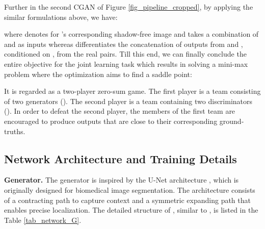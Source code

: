 \documentclass[10pt,twocolumn,letterpaper]{article}
\begin{document}
Further in the second CGAN of Figure \ref{fig_pipeline_cropped}, by applying the similar formulations above, we have:







\begin{table}[t]
	\begin{center}
	\end{center}
	\vspace{-5pt}
	\caption{The architectures for discriminator  of ST-CGAN. Annotations are kept the same with Table \ref{tab_network_G}.}
	\label{tab_network_D}
	\vspace{-8pt}
\end{table}



\vspace{-15pt}



where  denotes for 's corresponding shadow-free image and  takes a combination of  and  as inputs whereas  differentiates the concatenation of outputs from  and , conditioned on , from the real pairs. Till this end, we can finally conclude the entire objective for the joint learning task which results in solving a mini-max problem where the optimization aims to find a saddle point:

\vspace{-10pt}




It is regarded as a two-player zero-sum game. The first player is a team consisting of two generators (). The second player is a team containing two discriminators (). In order to defeat the second player, the members of the first team are encouraged to produce outputs that are close to their corresponding ground-truths. 


\subsection{Network Architecture and Training Details}
\noindent \textbf{Generator.} The generator is inspired by the U-Net architecture \cite{ronneberger2015u}, which is originally designed for biomedical image segmentation. The architecture consists of a contracting path to capture context and a symmetric expanding path that enables precise localization. The detailed structure of , similar to \cite{isola2016image}, is listed in the Table \ref{tab_network_G}.
\end{document}
